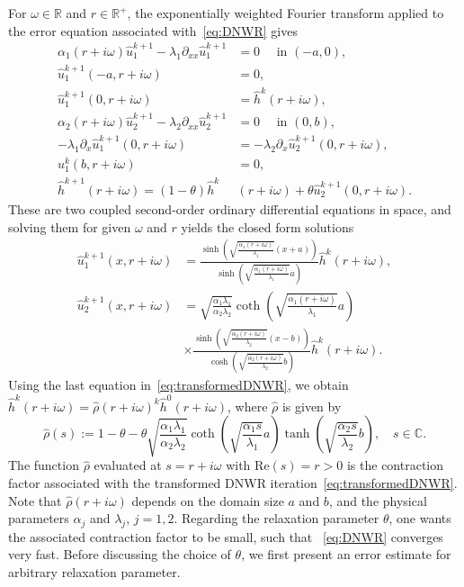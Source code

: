 \documentclass[reqno]{amsart}
\begin{document}
For $\omega\in\mathbb{R}$ and $r\in\mathbb{R}^+$, the exponentially weighted Fourier transform applied to the error equation associated with~\eqref{eq:DNWR} gives
\begin{equation}\label{eq:transformedDNWR}
\begin{aligned}
	\alpha_1 (r+i \omega) \hat{u}_1^{k+1} -\lambda_1 \partial_{xx} \hat{u}_1^{k+1} &= 0 \quad \text{ in } (-a,0),\\
	\hat{u}_1^{k+1}(-a, r+i \omega) &= 0,\\
	\hat{u}_1^{k+1}(0, r+i\omega) &= \hat h^{k}(r+i \omega),\\
	\alpha_2 (r+i \omega) \hat{u}_2^{k+1} -\lambda_2 \partial_{xx} \hat{u}_2^{k+1} &= 0 \quad \text{ in } (0,b),\\
	-\lambda_1 \partial_x \hat{u}_1^{k+1}(0, r+i \omega) &= -\lambda_2 \partial_x \hat{u}_2^{k+1}(0, r+i \omega),\\
	u_1^k(b, r+i \omega) &= 0, \\
	\hat{h}^{k+1}(r+i\omega) = (1-\theta) \hat{h}^k&(r+i\omega) + \theta \hat{u}^{k+1}_2(0, r+i \omega).
\end{aligned}
\end{equation}
These are two coupled second-order ordinary differential equations in space, and solving them for given $\omega$ and $r$ yields the closed form solutions
\[\begin{aligned}
	\hat{u}_1^{k+1}(x, r+i \omega) &= \frac{\sinh\left( \sqrt{\frac{\alpha_1 (r+i \omega)}{\lambda_1}} (x +a) \right)}{\sinh\left( \sqrt{\frac{\alpha_1 (r+i \omega)}{\lambda_1}} a \right)} \hat{h}^k(r+i \omega), \\
	\hat{u}_2^{k+1}(x, r+i \omega) &= 
	\sqrt{\frac{\alpha_1 \lambda_1}{\alpha_2 \lambda_2}}  \coth\left( \sqrt{\frac{\alpha_1 (r+i \omega)}{\lambda_1}} a\right) \\
	&\times \frac{\sinh\left( \sqrt{\frac{\alpha_2 (r+i \omega)}{\lambda_2}} (x - b) \right)}{\cosh\left( \sqrt{\frac{\alpha_2 (r+i \omega)}{\lambda_2}} b \right)} \hat{h}^k(r+i \omega).
\end{aligned}\]
Using the last equation in~\eqref{eq:transformedDNWR}, we obtain $\hat{h}^k(r+i \omega) = \hat{\rho}(r+i \omega)^k \hat{h}^0(r+i \omega)$, where $\hat{\rho}$ is given by
\begin{equation}\label{eq:cvfCont}
\hat{\rho}(s) := 1 - \theta - \theta \sqrt{\frac{\alpha_1 \lambda_1}{\alpha_2 \lambda_2}}\coth\left(\sqrt{\frac{\alpha_1 s}{\lambda_1}} a\right) \tanh\left(\sqrt{\frac{\alpha_2 s}{\lambda_2}} b\right), \quad s\in\mathbb{C}.
\end{equation}
The function $\hat{\rho}$ evaluated at $s=r+i\omega$ with $\text{Re}(s) = r>0$ is the contraction factor associated with the transformed DNWR iteration~\eqref{eq:transformedDNWR}. Note that $ \hat{\rho}(r+i \omega)$ depends on the domain size $a$ and $b$, and the physical parameters $\alpha_j$ and $\lambda_j$, $j=1, 2$. 
Regarding the relaxation parameter $\theta$, one wants the associated contraction factor to be small, such that ~\eqref{eq:DNWR} converges very fast. Before discussing the choice of $\theta$, we first present an error estimate for arbitrary relaxation parameter.
\end{document}
